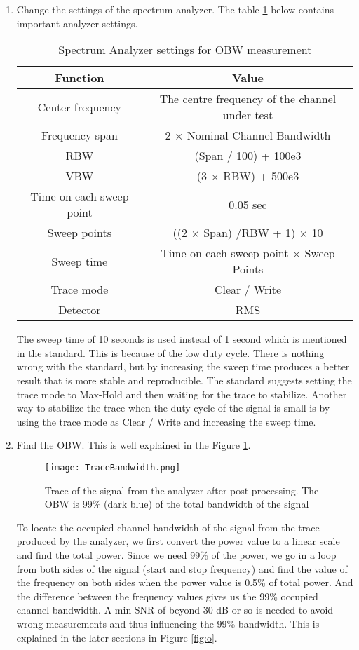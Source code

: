 \begin{enumerate}
\item Change the settings of the spectrum analyzer. The table \ref{tab:analyzer} below contains important analyzer settings.
\begin{table}[H]
\begin{center}
\begin {tabular} {|c|c|} 
\toprule
Function & Value \\ 
\midrule 
Center frequency & The centre frequency of the channel under test \\
Frequency span &2 $\times$ Nominal Channel Bandwidth \\
\ac{RBW} & (Span / 100) + 100e3 \\
\ac{VBW} & (3 $\times$ RBW) + 500e3\\
Time on each sweep point & 0.05 sec\\
Sweep points & ((2 $\times$ Span) /RBW + 1) $\times$ 10\\
Sweep time & Time on each sweep point $\times$ Sweep Points \\
Trace mode & Clear / Write\\
Detector & \ac{RMS}\\
\bottomrule
\end{tabular} 
\caption{Spectrum Analyzer settings for \ac{OBW} measurement}
\label{tab:analyzer}
\end{center}
\end{table}
The sweep time of 10 seconds is used instead of 1 second which is mentioned in the standard. This is because of the low duty cycle. There is nothing wrong with the standard, but by increasing the sweep time produces a better result that is more stable and reproducible. The standard suggests setting the trace mode to Max-Hold and then waiting for the trace to stabilize. Another way to stabilize the trace when the duty cycle of the signal is small is by using the trace mode as Clear / Write and increasing the sweep time.

\item Find the \ac{OBW}. This is well explained in the Figure \ref{fig:tracebw}.
\begin{figure}[H]
\centering
\texttt{[image: TraceBandwidth.png]}
\caption{Trace of the signal from the analyzer after post processing. The \acs{OBW} is 99\% (dark blue) of the total bandwidth of the signal}
\label{fig:tracebw}
\end{figure}
To locate the occupied channel bandwidth of the signal from the trace produced by the analyzer, we first convert the power value to a linear scale and find the total power. Since we need 99\% of the power, we go in a loop from both sides of the signal (start and stop frequency) and find the value of the frequency on both sides when the power value is 0.5\% of total power. And the difference between the frequency values gives us the 99\% occupied channel bandwidth. A min \acf{SNR} of beyond 30 dB or so is needed to avoid wrong measurements and thus influencing the 99\% bandwidth. This is explained in the later sections in Figure \ref{fig:o}.

\end{enumerate}
  
